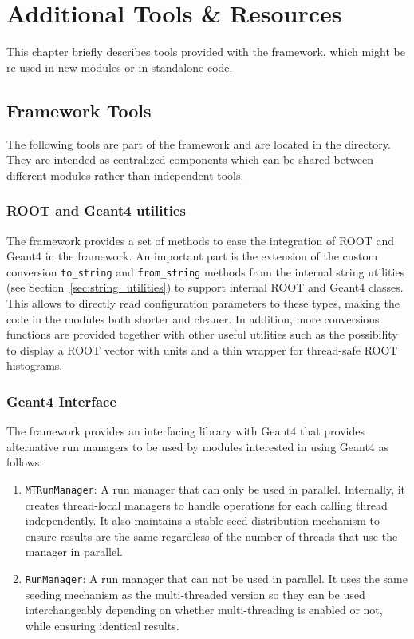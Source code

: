 \chapter{Additional Tools \& Resources}
\label{ch:additional_tools_resources}

This chapter briefly describes tools provided with the \apsq framework, which might be re-used in new modules or in standalone code.

\section{Framework Tools}

The following tools are part of the \apsq framework and are located in the  directory.
They are intended as centralized components which can be shared between different modules rather than independent tools.

\subsection{ROOT and Geant4 utilities}
\label{sec:root_and_geant4_utilities}
The framework provides a set of methods to ease the integration of ROOT and Geant4 in the framework.
An important part is the extension of the custom conversion \texttt{to\_string} and \texttt{from\_string} methods from the internal string utilities (see Section~\ref{sec:string_utilities}) to support internal ROOT and Geant4 classes.
This allows to directly read configuration parameters to these types, making the code in the modules both shorter and cleaner.
In addition, more conversions functions are provided together with other useful utilities such as the possibility to display a ROOT vector with units and a thin wrapper for thread-safe ROOT histograms.

\subsection{Geant4 Interface}
\label{sec:geant4_interface}
The framework provides an interfacing library with Geant4 that provides alternative run managers to be used by modules interested in using Geant4 as follows:
\begin{enumerate}
\item \texttt{MTRunManager}: A run manager that can only be used in parallel. Internally, it creates thread-local managers to handle operations for each calling thread independently. It also maintains a stable seed distribution mechanism to ensure results are the same regardless of the number of threads that use the manager in parallel.
\item \texttt{RunManager}: A run manager that can not be used in parallel. It uses the same seeding mechanism as the multi-threaded version so they can be used interchangeably depending on whether multi-threading is enabled or not, while ensuring identical results.
\end{enumerate}

